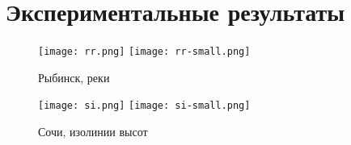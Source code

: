 \chapter{Экспериментальные результаты}
\begin{figure}[h]
  \centerline {
    \mbox{\texttt{[image: rr.png]}}
    \mbox{\texttt{[image: rr-small.png]}}
  }
  \caption{Рыбинск, реки}
  \label{pic:input_maps}
\end{figure}
\begin{figure}[h]
  \centerline {
    \mbox{\texttt{[image: si.png]}}
    \mbox{\texttt{[image: si-small.png]}}
  }
  \caption{Сочи, изолинии высот}
  \label{pic:input_maps}
\end{figure}

